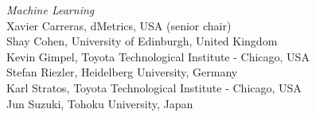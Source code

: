 \emph{Machine Learning} \\
\hspace*{0.2in}Xavier Carreras, dMetrics, USA (senior chair)\\
\hspace*{0.2in}Shay Cohen, University of Edinburgh, United Kingdom\\
\hspace*{0.2in}Kevin Gimpel, Toyota Technological Institute - Chicago, USA\\
\hspace*{0.2in}Stefan Riezler, Heidelberg University, Germany\\
\hspace*{0.2in}Karl Stratos, Toyota Technological Institute - Chicago, USA\\
\hspace*{0.2in}Jun Suzuki, Tohoku University, Japan


